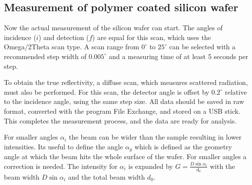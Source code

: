 \subsection{Measurement of polymer coated silicon wafer}

Now the actual measurement of the silicon wafer can start. The angles of incidence (\( i \)) and detection (\( f \)) are equal for this scan, which uses the Omega/2Theta scan type. A scan range from \( 0^\circ \) to \( 25^\circ \) can be selected with a recommended step width of \( 0.005^\circ \) and a measuring time of at least 5 seconds per step.

To obtain the true reflectivity, a diffuse scan, which measures scattered radiation, must also be performed. For this scan, the detector angle is offset by \( 0.2^\circ \) relative to the incidence angle, using the same step size. All data should be saved in raw format, converted with the program File Exchange, and stored on a USB stick. This completes the measurement process, and the data are ready for analysis.

For smaller angles $\alpha_i$ the beam can be wider than the sample resulting in lower intensities. Its useful to define the angle $\alpha_g$ which is defined as the geometry angle at which the beam hits the whole surface of the wafer. For smaller angles a correction is needed. The intensity for $\alpha_i$ is expanded by $G=\frac{D\sin{\alpha_i}}{d_0}$ with the beam width $D\sin{\alpha_i}$ and the total beam width $d_0$.  